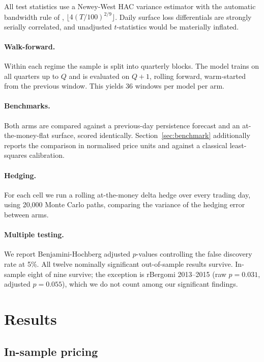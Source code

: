 \documentclass[11pt,a4paper]{article}
\begin{document}
All test statistics use a Newey-West HAC variance estimator \citep{newey1987}
with the automatic bandwidth rule of \citet{andrews1991},
$\lfloor 4(T/100)^{2/9}\rfloor$. Daily surface loss differentials are strongly
serially correlated, and unadjusted $t$-statistics would be materially inflated.

\paragraph{Walk-forward.} Within each regime the sample is split into quarterly
blocks. The model trains on all quarters up to $Q$ and is evaluated on $Q+1$,
rolling forward, warm-started from the previous window. This yields 36 windows
per model per arm.

\paragraph{Benchmarks.} Both arms are compared against a previous-day
persistence forecast and an at-the-money-flat surface, scored identically.
Section~\ref{sec:benchmark} additionally reports the comparison in normalised
price units and against a classical least-squares calibration.

\paragraph{Hedging.} For each cell we run a rolling at-the-money delta hedge
over every trading day, using 20{,}000 Monte Carlo paths, comparing the variance
of the hedging error between arms.

\paragraph{Multiple testing.} We report Benjamini-Hochberg
\citep{benjamini1995} adjusted $p$-values controlling the false discovery rate
at 5\%. All twelve nominally significant out-of-sample results survive. In-sample
eight of nine survive; the exception is rBergomi 2013--2015 (raw $p = 0.031$,
adjusted $p = 0.055$), which we do not count among our significant findings.

\section{Results}

\subsection{In-sample pricing}
\end{document}
